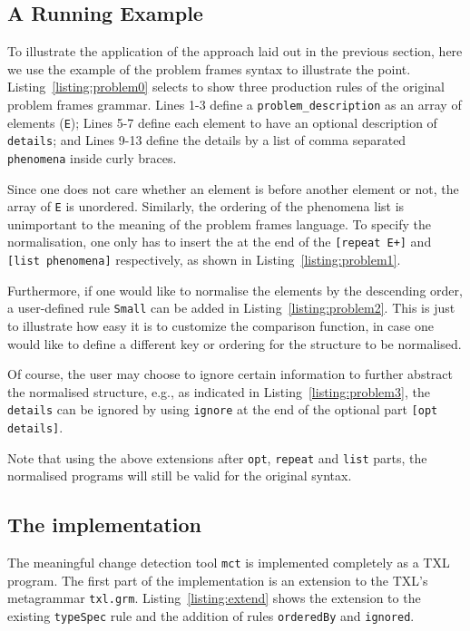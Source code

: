 \documentclass{acm_proc_article-sp}
\begin{document}
\subsection{A Running Example}\label{sec:example}
To illustrate the application of the approach laid out in the previous section, here we use the example of the problem frames syntax to illustrate the point. Listing~\ref{listing:problem0} selects to show three production rules of the original problem frames grammar. Lines 1-3 define a {\tt problem\_description} as an array of elements ({\tt E}); Lines 5-7 define each element to have an optional description of {\tt details}; and Lines 9-13 define the details by a list of comma separated {\tt phenomena} inside curly braces. 

Since one does not care whether an element is before another element or not, the array of {\tt E}  is unordered. Similarly, the ordering of the phenomena list is unimportant to the meaning of the problem frames language. To specify the normalisation, one only has to insert the  at the end of the {\tt [repeat E+]} and {\tt [list phenomena]} respectively, as shown in Listing~\ref{listing:problem1}.

Furthermore, if one would like to normalise the elements by the descending order, a user-defined rule {\tt Small} can be added in Listing~\ref{listing:problem2}. This is just to illustrate how easy it is to customize the comparison function, in case one would like to define a different key or ordering for the structure to be normalised.

Of course, the user may choose to ignore certain information to further abstract the normalised structure, e.g., as indicated in Listing~\ref{listing:problem3}, the {\tt details} can be ignored by using {\tt ignore} at the end of the optional part {\tt [opt details]}. 

Note that using the above extensions after {\tt opt}, {\tt repeat} and {\tt list} parts, the normalised programs will still be valid for the original syntax.

\subsection{The implementation}
The meaningful change detection tool {\tt mct} is implemented completely as a TXL program. The first part of the implementation is an extension to the TXL's metagrammar {\tt txl.grm}. Listing~\ref{listing:extend} shows the extension to the existing {\tt typeSpec} rule and the addition of rules {\tt orderedBy} and {\tt ignored}.

 
\end{document}
